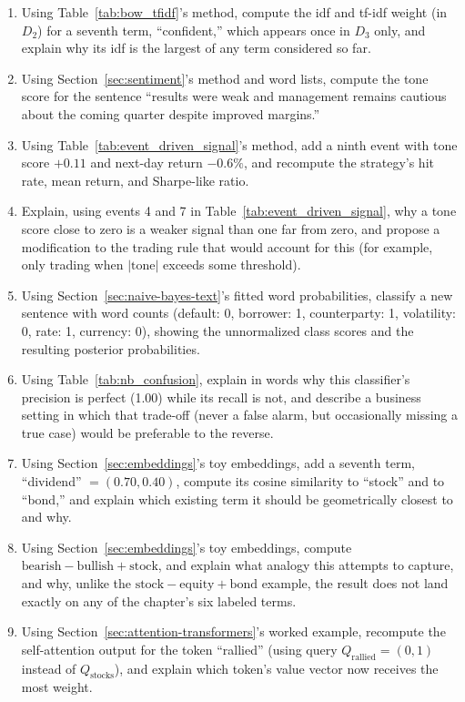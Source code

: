 \documentclass[../ai_in_finance]{subfiles}
\begin{document}
\begin{enumerate}[exercises]
    \item Using Table~\ref{tab:bow_tfidf}'s method, compute the idf and tf-idf weight (in $D_2$) for a seventh term, ``confident,'' which appears once in $D_3$ only, and explain why its idf is the largest of any term considered so far.
    \item Using Section~\ref{sec:sentiment}'s method and word lists, compute the tone score for the sentence ``results were weak and management remains cautious about the coming quarter despite improved margins.''
    \item Using Table~\ref{tab:event_driven_signal}'s method, add a ninth event with tone score $+0.11$ and next-day return $-0.6\%$, and recompute the strategy's hit rate, mean return, and Sharpe-like ratio.
    \item Explain, using events 4 and 7 in Table~\ref{tab:event_driven_signal}, why a tone score close to zero is a weaker signal than one far from zero, and propose a modification to the trading rule that would account for this (for example, only trading when $|\text{tone}| $ exceeds some threshold).
    \item Using Section~\ref{sec:naive-bayes-text}'s fitted word probabilities, classify a new sentence with word counts (default: 0, borrower: 1, counterparty: 1, volatility: 0, rate: 1, currency: 0), showing the unnormalized class scores and the resulting posterior probabilities.
    \item Using Table~\ref{tab:nb_confusion}, explain in words why this classifier's precision is perfect (1.00) while its recall is not, and describe a business setting in which that trade-off (never a false alarm, but occasionally missing a true case) would be preferable to the reverse.
    \item Using Section~\ref{sec:embeddings}'s toy embeddings, add a seventh term, ``dividend'' $=(0.70, 0.40)$, compute its cosine similarity to ``stock'' and to ``bond,'' and explain which existing term it should be geometrically closest to and why.
    \item Using Section~\ref{sec:embeddings}'s toy embeddings, compute $\text{bearish} - \text{bullish} + \text{stock}$, and explain what analogy this attempts to capture, and why, unlike the $\text{stock}-\text{equity}+\text{bond}$ example, the result does not land exactly on any of the chapter's six labeled terms.
    \item Using Section~\ref{sec:attention-transformers}'s worked example, recompute the self-attention output for the token ``rallied'' (using query $Q_{\text{rallied}} = (0,1)$ instead of $Q_{\text{stocks}}$), and explain which token's value vector now receives the most weight.

\end{enumerate}
\end{document}
